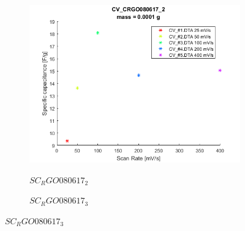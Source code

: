 \begin{figure}
{\begin{subfigure}[t]{0.3\textwidth}
{				\includegraphics[width=\textwidth]{./Data/SC_CRGO080617_2.png}
			}
			\caption{$SC_RGO080617_2$}
			\label{fig:SC_RGO080617_2}
		\end{subfigure}\hfill
		\begin{subfigure}[t]{0.3\textwidth}	
			\caption{$SC_RGO080617_3$}
			\label{fig:SC_RGO080617_3}
		\end{subfigure}
	}

\end{figure}
	

